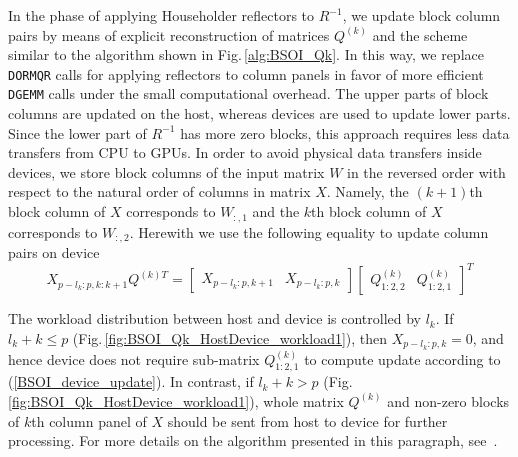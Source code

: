 \documentclass{llncs}
\begin{document}
In the phase of applying Householder reflectors to $R^{-1}$,
we update block column pairs by means of 
explicit reconstruction of matrices $Q^{(k)}$
and the scheme similar to the algorithm shown in Fig.\,\ref{alg:BSOI_Qk}.
In this way, we replace {\tt DORMQR} calls for applying reflectors to column panels 
in favor of more efficient {\tt DGEMM} calls
under the small computational overhead.
The upper parts of block columns are updated on the host, 
whereas devices are used to update lower parts. 
Since the lower part of $R^{-1}$ has more zero blocks,
this approach requires less data transfers from CPU to GPUs.
In order to avoid physical data transfers inside devices,
we store block columns of the input matrix $W$ in the reversed order 
with respect to the natural order of columns in matrix $X$. 
Namely, the $(k+1)$th block column of $X$ 
corresponds to ${W}_{:,1}$ and 
the $k$th block column of $X$ 
corresponds to ${W}_{:,2}$.
Herewith we use the following equality to update column pairs on device 
\begin{equation}
  \label{BSOI_device_update}
    X_{p-l_k:p,k:k+1}   Q^{{(k)}T} = 
    \begin{bmatrix}
      X_{p-l_k:p,k+1} & X_{p-l_k:p,k}
    \end{bmatrix} 
    \begin{bmatrix}
      Q^{(k)}_{1:2,2} & Q^{(k)}_{1:2,1}
    \end{bmatrix}^T  
\end{equation}

The workload distribution between host and device
is controlled by %
$l_k$. 
If $l_k + k \leq p$ (Fig.\,\ref{fig:BSOI_Qk_HostDevice_workload1}),
then $X_{p-l_k:p,k}=0$,
and hence device does not require sub-matrix $Q^{(k)}_{1:2,1}$
to compute update according to (\ref{BSOI_device_update}).
In contrast,
if $l_k + k > p$ (Fig.\,\ref{fig:BSOI_Qk_HostDevice_workload1}),
whole matrix $Q^{(k)}$ and non-zero blocks of $k$th column panel of $X$
should be sent from host to device for further processing.
For more details on the algorithm presented in this paragraph,
see~\cite{GogolenkoBai13}.
\end{document}
